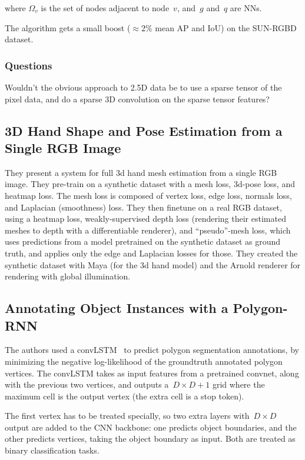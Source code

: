 \documentclass[a4paper, 12pt]{article}
\begin{document}
where $\Omega_v$ is the set of nodes adjacent to node~$v$, and~$g$ and~$q$ are
NNs.

The algorithm gets a small boost ($\approx 2\%$ mean AP and IoU) on the
SUN-RGBD dataset.


\subsubsection{Questions}

Wouldn't the obvious approach to 2.5D data be to use a sparse tensor of the
pixel data, and do a sparse 3D convolution on the sparse tensor features?


\subsection{3D Hand Shape and Pose Estimation from a Single {RGB}
            Image~\cite{ge20193dhand}}

They present a system for full 3d hand mesh estimation from a single RGB image.
They pre-train on a synthetic dataset with a mesh loss, 3d-pose loss, and
heatmap loss.
The mesh loss is composed of vertex loss, edge loss, normals loss, and
Laplacian (smoothness) loss.
They then finetune on a real RGB dataset, using a heatmap loss,
weakly-supervised depth loss (rendering their estimated meshes to depth with a
differentiable renderer), and ``pseudo''-mesh loss, which uses predictions from
a model pretrained on the synthetic dataset as ground truth, and applies only
the edge and Laplacian losses for those.
They created the synthetic dataset with Maya (for the 3d hand model) and the
Arnold renderer for rendering with global illumination.


\subsection{Annotating Object Instances with a
            Polygon-RNN~\cite{castrejon2017annotating}}

The authors used a convLSTM~\cite{shi2015convolutional} to predict polygon
segmentation annotations, by minimizing the negative log-likelihood of the
groundtruth annotated polygon vertices. The convLSTM takes as input features
from a pretrained convnet, along with the previous two vertices, and outputs
a~$D \times D + 1$ grid where the maximum cell is the output vertex (the extra
cell is a stop token).

The first vertex has to be treated specially, so two extra layers
with~$D \times D$ output are added to the CNN backbone: one predicts object
boundaries, and the other predicts vertices, taking the object boundary as
input. Both are treated as binary classification tasks.
\end{document}
